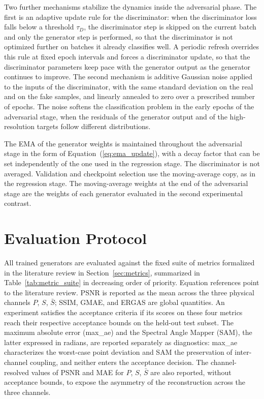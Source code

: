 Two further mechanisms stabilize the dynamics inside the adversarial phase. The first is an adaptive update rule for the discriminator: when the discriminator loss falls below a threshold $\tau_D$, the discriminator step is skipped on the current batch and only the generator step is performed, so that the discriminator is not optimized further on batches it already classifies well. A periodic refresh overrides this rule at fixed epoch intervals and forces a discriminator update, so that the discriminator parameters keep pace with the generator output as the generator continues to improve. The second mechanism is additive Gaussian noise applied to the inputs of the discriminator, with the same standard deviation on the real and on the fake samples, and linearly annealed to zero over a prescribed number of epochs. The noise softens the classification problem in the early epochs of the adversarial stage, when the residuals of the generator output and of the high-resolution targets follow different distributions.

The EMA of the generator weights is maintained throughout the adversarial stage in the form of Equation~(\ref{eq:ema_update}), with a decay factor that can be set independently of the one used in the regression stage. The discriminator is not averaged. Validation and checkpoint selection use the moving-average copy, as in the regression stage. The moving-average weights at the end of the adversarial stage are the weights of each generator evaluated in the second experimental contrast.

\section{Evaluation Protocol}
\label{sec:method_evaluation}

All trained generators are evaluated against the fixed suite of metrics formalized in the literature review in Section~\ref{sec:metrics}, summarized in Table~\ref{tab:metric_suite} in decreasing order of priority. Equation references point to the literature review. PSNR is reported as the mean across the three physical channels $P$, $S$, $\bar{S}$; SSIM, GMAE, and ERGAS are global quantities. An experiment satisfies the acceptance criteria if its scores on these four metrics reach their respective acceptance bounds on the held-out test subset. The maximum absolute error (max\_ae) and the Spectral Angle Mapper (SAM), the latter expressed in radians, are reported separately as diagnostics: max\_ae characterizes the worst-case point deviation and SAM the preservation of inter-channel coupling, and neither enters the acceptance decision. The channel-resolved values of PSNR and MAE for $P$, $S$, $\bar{S}$ are also reported, without acceptance bounds, to expose the asymmetry of the reconstruction across the three channels.

